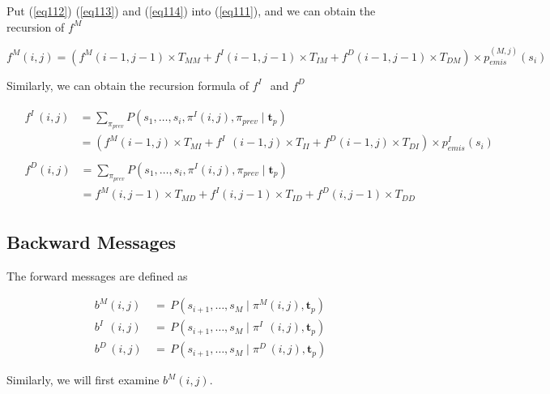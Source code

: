 \documentclass[10pt]{article}
\begin{document}
    Put (\ref{eq112}) (\ref{eq113}) and (\ref{eq114}) into (\ref{eq111}), and we can obtain the recursion of $f^{M}$
    
    \begin{equation} \label{eq115}
      f^{M}(i, j) = (f^{M}(i-1, j-1) \times T_{MM}  + f^{I}(i-1, j-1) \times T_{IM} + f^{D}(i-1, j-1) \times T_{DM}) \times p_{emis}^{(M, j)}(s_{i})
    \end{equation}

    Similarly, we can obtain the recursion formula of $f^{I\;\;}$ and $f^{D\;}$

    \begin{align}
      &\begin{aligned} \label{eq116}
        f^{I\;}(i, j) &= \sum\nolimits_{\pi_{prev}} P(s_1, \dots,s_{i}, \pi^{I}(i, j), \pi_{prev} \;|\; \mathbf{t}_{p}) \\
                    &= (f^{M}(i-1, j) \times T_{MI}  + f^{I\;\;}(i-1, j) \times T_{II} + f^{D}(i-1, j) \times T_{DI}) \times p_{emis}^{I}(s_{i})
      \end{aligned} \\
      &\begin{aligned} \label{eq117}
        f^{D}(i, j) &= \sum\nolimits_{\pi_{prev}} P(s_1, \dots,s_{i}, \pi^{I}(i, j), \pi_{prev} \;|\; \mathbf{t}_{p}) \\
                    &= f^{M}(i, j-1) \times T_{MD}  + f^{I}(i, j-1) \times T_{ID} + f^{D}(i, j-1) \times T_{DD}
      \end{aligned}
    \end{align}

  \subsection{Backward Messages}

    The forward messages are defined as

    \begin{equation}
    \begin{aligned}
      b^{M}(i, j) \,&=\, P(s_{i+1}, \dots,s_M \;|\; \pi^M(i, j), \mathbf{t}_{p}) \\
      b^{I\;\;}(i, j) \,&=\, P(s_{i+1}, \dots,s_M \;|\; \pi^{I\;\;}(i, j), \mathbf{t}_{p}) \\
      b^{D\;}(i, j) \,&=\, P(s_{i+1}, \dots,s_M \;|\; \pi^{D\;}(i, j), \mathbf{t}_{p})
    \end{aligned}
    \end{equation}

    Similarly, we will first examine $b^{M}(i, j)$.
\end{document}
